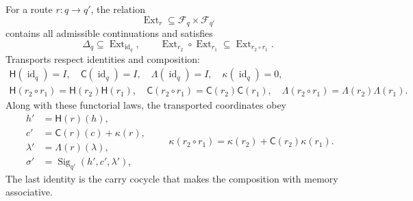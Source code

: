 For a route \(r:q\to q'\), the relation
\begin{equation}
\operatorname{Ext}_r\subseteq\mathcal F_q\times\mathcal F_{q'}
\label{p12-83-c3-s1:eq:tpk-extension-relation}
\end{equation}
contains all admissible continuations and satisfies
\[
\Delta_q\subseteq\operatorname{Ext}_{\operatorname{id}_q},
\qquad
\operatorname{Ext}_{r_2}\circ\operatorname{Ext}_{r_1}
\subseteq\operatorname{Ext}_{r_2\circ r_1}.
\]
Transports respect identities and composition:
\begin{equation}
\begin{gathered}
\mathsf H(\operatorname{id}_q)=I,
\quad \mathsf C(\operatorname{id}_q)=I,
\quad \mathsf\Lambda(\operatorname{id}_q)=I,
\quad \kappa(\operatorname{id}_q)=0,\\
\mathsf H(r_2\!\circ r_1)=\mathsf H(r_2)\mathsf H(r_1),
\quad
\mathsf C(r_2\!\circ r_1)=\mathsf C(r_2)\mathsf C(r_1),
\quad
\mathsf\Lambda(r_2\!\circ r_1)=
\mathsf\Lambda(r_2)\mathsf\Lambda(r_1).
\end{gathered}
\label{p12-83-c3-s1:eq:tpk-functorial-transport}
\end{equation}
Along with these functorial laws, the transported coordinates obey
\begin{equation}
\begin{aligned}
h'&=\mathsf H(r)(h),\\
c'&=\mathsf C(r)(c)+\kappa(r),\\
\lambda'&=\mathsf\Lambda(r)(\lambda),\\
\sigma'&=\operatorname{Sig}_{q'}(h',c',\lambda'),
\end{aligned}
\qquad
\kappa(r_2\circ r_1)
=\kappa(r_2)+\mathsf C(r_2)\kappa(r_1).
\label{p12-83-c3-s1:eq:tpk-typed-transport}
\end{equation}
The last identity is the carry cocycle that makes the composition with memory associative.

